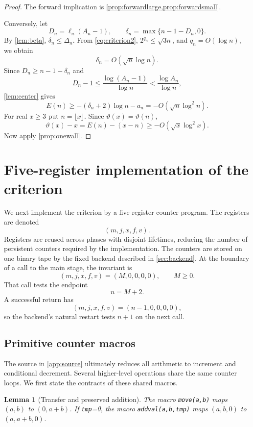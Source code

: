 \documentclass[10pt]{article}
\newtheorem{lemma}[theorem]{Lemma}
\theoremstyle{definition}
\newcommand{\tht}{\vartheta}
\begin{document}
\begin{proof}
The forward implication is \cref{prop:forwardlarge,prop:forwardsmall}.

Conversely, let
\[
D_n=\ell_n(A_n-1),
\qquad
\delta_n=\max\{n-1-D_n,0\}.
\]
By \cref{lem:beta}, $\delta_n\le\Delta_n$. From \eqref{eq:criterion2},
$2^{q_n}\le\sqrt{3n}$, and $q_n=O(\log n)$, we obtain
\[
\delta_n=O(\sqrt n\log n).
\]
Since $D_n\ge n-1-\delta_n$ and
\[
D_n-1\le\frac{\log(A_n-1)}{\log n}<\frac{\log A_n}{\log n},
\]
\cref{lem:center} gives
\[
E(n)\ge-(\delta_n+2)\log n-a_n
=-O(\sqrt n\log^2n).
\]
For real $x\ge3$ put $n=\lfloor x\rfloor$. Since $\tht(x)=\tht(n)$,
\[
\tht(x)-x=E(n)-(x-n)\ge -O(\sqrt x\log^2x).
\]
Now apply \cref{prop:onewall}.
\end{proof}

\section{Five-register implementation of the criterion}

We next implement the criterion by a five-register counter program. The
registers are denoted
\[
(m,j,x,f,v).
\]
Registers are reused across phases with disjoint lifetimes, reducing the
number of persistent counters required by the implementation. The counters are
stored on one binary tape by the fixed backend described in
\cref{sec:backend}. At the boundary of a call to the main stage, the invariant
is
\begin{equation}
\label{eq:mainentry}
(m,j,x,f,v)=(M,0,0,0,0),\qquad M\ge0.
\end{equation}
That call tests the endpoint
\[
n=M+2.
\]
A successful return has
\[
(m,j,x,f,v)=(n-1,0,0,0,0),
\]
so the backend's natural restart tests $n+1$ on the next call.

\subsection{Primitive counter macros}

The source in \cref{app:source} ultimately reduces all arithmetic to increment
and conditional decrement. Several higher-level operations share the same
counter loops. We first state the contracts of these shared macros.

\begin{lemma}[Transfer and preserved addition]
\label{lem:transfer}
The macro \texttt{move(a,b)} maps $(a,b)$ to $(0,a+b)$. If \texttt{tmp}=0, the
macro \texttt{addval(a,b,tmp)} maps $(a,b,0)$ to $(a,a+b,0)$.
\end{lemma}
\end{document}
